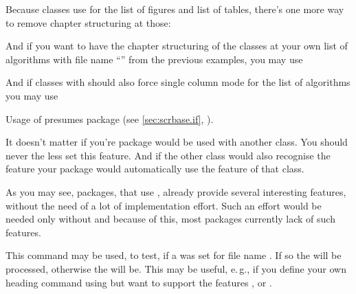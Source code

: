 \begin{Example}
  Because \KOMAScript{} classes use  for the list of figures
  and list of tables, there's one more way to remove chapter structuring at
  those:
\begin{lstcode}
\end{lstcode}

  And if you want to have the chapter structuring of the \KOMAScript{} classes
  at your own list of algorithms with file name 
  ``'' from the previous examples, you may use
\begin{lstcode}
\end{lstcode}
  And if classes with  should also force single column mode for
  the list of algorithms you may use
\begin{lstcode}
\end{lstcode}
  Usage of  presumes package  (see
  \autoref{sec:scrbase.if},
  ).

  It doesn't matter if you're package would be used with
  another class. You should never the less set this feature. And if the other
  class would also recognise the feature your package would automatically use
  the feature of that class.
\end{Example}
As you may see, packages, that use , already provide several
interesting features, without the need of a lot of implementation effort. Such
an effort would be needed only without  and because of this,
most packages currently lack of such features.%
%
%

\begin{Declaration}
\end{Declaration}
%
This command may be used, to test, if a  was set for file name
. If so the  will be processed,
otherwise the  will be. This may be useful, e.\,g.,
if you define your own heading command using  but want to
support the features ,  or .%
%


